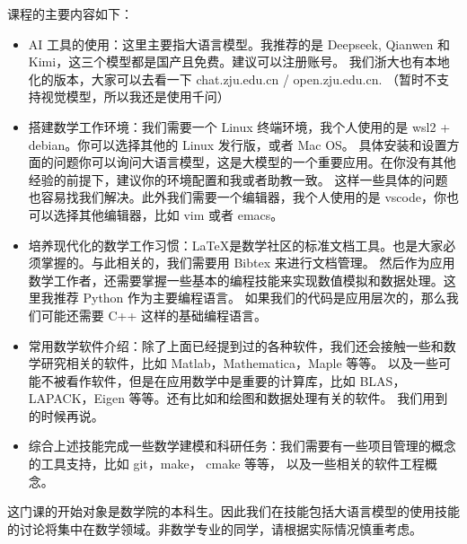 \documentclass{ctexbook}
\numberwithin{theorem}{chapter}
\begin{document}
课程的主要内容如下：
\begin{itemize}
  \item AI 工具的使用：这里主要指大语言模型。我推荐的是 Deepseek, Qianwen 和 Kimi，这三个模型都是国产且免费。建议可以注册账号。
  我们浙大也有本地化的版本，大家可以去看一下 chat.zju.edu.cn / open.zju.edu.cn. （暂时不支持视觉模型，所以我还是使用千问）
  \item 搭建数学工作环境：我们需要一个 Linux 终端环境，我个人使用的是 wsl2 + debian。你可以选择其他的 Linux 发行版，或者 Mac OS。
  具体安装和设置方面的问题你可以询问大语言模型，这是大模型的一个重要应用。在你没有其他经验的前提下，建议你的环境配置和我或者助教一致。
  这样一些具体的问题也容易找我们解决。此外我们需要一个编辑器，我个人使用的是 vscode，你也可以选择其他编辑器，比如 vim 或者 emacs。  
  \item 培养现代化的数学工作习惯：\LaTeX 是数学社区的标准文档工具。也是大家必须掌握的。与此相关的，我们需要用 Bibtex 来进行文档管理。
  然后作为应用数学工作者，还需要掌握一些基本的编程技能来实现数值模拟和数据处理。这里我推荐 Python 作为主要编程语言。
  如果我们的代码是应用层次的，那么我们可能还需要 C++ 这样的基础编程语言。
  \item 常用数学软件介绍：除了上面已经提到过的各种软件，我们还会接触一些和数学研究相关的软件，比如 Matlab，Mathematica，Maple 等等。
  以及一些可能不被看作软件，但是在应用数学中是重要的计算库，比如 BLAS，LAPACK，Eigen 等等。还有比如和绘图和数据处理有关的软件。
  我们用到的时候再说。
  \item 综合上述技能完成一些数学建模和科研任务：我们需要有一些项目管理的概念的工具支持，比如 git，make， cmake 等等，
  以及一些相关的软件工程概念。
\end{itemize}

这门课的开始对象是数学院的本科生。因此我们在技能包括大语言模型的使用技能的讨论将集中在数学领域。非数学专业的同学，请根据实际情况慎重考虑。


\end{document}
